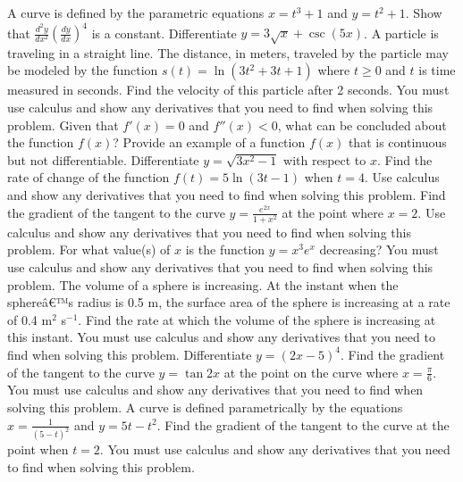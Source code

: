 \documentclass[12pt,addpoints]{exam}
\begin{document}
\begin{questions}
\fillwithlines{3cm}
\question[5] A curve is defined by the parametric equations \( x = t^3 + 1 \) and \( y = t^2 + 1 \). Show that \(\frac{d^2y}{dx^2} \left( \frac{dy}{dx} \right)^4\) is a constant.
\fillwithlines{3cm}
\question[5] Differentiate \( y = 3\sqrt{x} + \csc(5x) \).
\fillwithlines{3cm}
\question[5] A particle is traveling in a straight line. The distance, in meters, traveled by the particle may be modeled by the function \( s(t) = \ln(3t^2 + 3t + 1) \) where \( t \geq 0 \) and \( t \) is time measured in seconds. Find the velocity of this particle after 2 seconds. You must use calculus and show any derivatives that you need to find when solving this problem.
\fillwithlines{3cm}
\question[5] Given that \( f'(x) = 0 \) and \( f''(x) < 0 \), what can be concluded about the function \( f(x) \)?
\fillwithlines{3cm}
\question[5] Provide an example of a function \( f(x) \) that is continuous but not differentiable.
\fillwithlines{3cm}
\question[5] Differentiate \( y = \sqrt{3x^2 - 1} \) with respect to \( x \).
\fillwithlines{3cm}
\question[5] Find the rate of change of the function \( f(t) = 5 \ln(3t - 1) \) when \( t = 4 \). Use calculus and show any derivatives that you need to find when solving this problem.
\fillwithlines{3cm}
\question[5] Find the gradient of the tangent to the curve \( y = \frac{e^{2x}}{1 + x^2} \) at the point where \( x = 2 \). Use calculus and show any derivatives that you need to find when solving this problem.
\fillwithlines{3cm}
\question[5] For what value(s) of \( x \) is the function \( y = x^3 e^x \) decreasing? You must use calculus and show any derivatives that you need to find when solving this problem.
\fillwithlines{3cm}
\question[5] The volume of a sphere is increasing. At the instant when the sphereâ€™s radius is 0.5 m, the surface area of the sphere is increasing at a rate of 0.4 m\(^2\) s\(^{-1}\). Find the rate at which the volume of the sphere is increasing at this instant. You must use calculus and show any derivatives that you need to find when solving this problem.
\fillwithlines{3cm}
\question[5] Differentiate \( y = (2x - 5)^4 \).
\fillwithlines{3cm}
\question[5] Find the gradient of the tangent to the curve \( y = \tan 2x \) at the point on the curve where \( x = \frac{\pi}{6} \). You must use calculus and show any derivatives that you need to find when solving this problem.
\fillwithlines{3cm}
\question[5] A curve is defined parametrically by the equations \( x = \frac{1}{(5-t)^2} \) and \( y = 5t - t^2 \). Find the gradient of the tangent to the curve at the point when \( t = 2 \). You must use calculus and show any derivatives that you need to find when solving this problem.

\end{questions}
\end{document}
